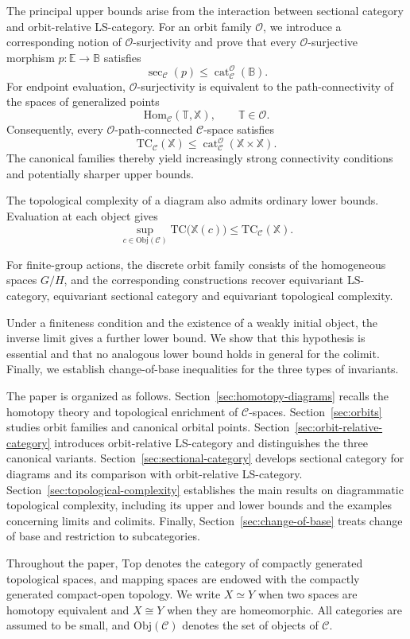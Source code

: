 \documentclass[12pt]{amsart}
\theoremstyle{definition}
\theoremstyle{remark}
\numberwithin{figure}{section}%
\newcommand{\CC}{\mathcal{C}}
\newcommand{\cat}{\mathop{\mathrm{cat}}}
\newcommand{\TC}{\mathrm{TC}}
\newcommand{\Top}{\mathrm{Top}}
\newcommand{\X}{\mathbb{X}}
\newcommand{\T}{\mathbb{T}}
\newcommand{\Hom}{\mathrm{Hom}}
\newcommand{\Obj}{\mathrm{Obj}}
\newcommand{\Ee}{\mathbb{E}}
\newcommand{\Bb}{\mathbb{B}}
\begin{document}
The principal upper bounds arise from the interaction between
sectional category and orbit-relative LS-category. For an orbit family
$\mathcal O$, we introduce a corresponding notion of
$\mathcal O$-surjectivity and prove that every
$\mathcal O$-surjective morphism
$p\colon\Ee\to\Bb$ satisfies
\[
\sec_{\CC}(p)
\leq
\cat_{\CC}^{\mathcal O}(\Bb).
\]
For endpoint evaluation, $\mathcal O$-surjectivity is equivalent to the
path-connectivity of the spaces of generalized points
\[
\Hom_{\CC}(\T,\X),
\qquad
\T\in\mathcal O.
\]
Consequently, every $\mathcal O$-path-connected $\CC$-space satisfies
\[
\TC_{\CC}(\X)
\leq
\cat_{\CC}^{\mathcal O}(\X\times\X).
\]
The canonical families thereby yield increasingly strong connectivity
conditions and potentially sharper upper bounds.

The topological complexity of a diagram also admits ordinary lower
bounds. Evaluation at each object gives
\[
\sup_{c\in\Obj(\CC)}
\TC\bigl(\X(c)\bigr)
\leq
\TC_{\CC}(\X).
\]

For finite-group actions, the discrete orbit family consists of the
homogeneous spaces $G/H$, and the corresponding constructions recover
equivariant LS-category, equivariant sectional category and equivariant
topological complexity. 

Under a finiteness condition and the existence of a weakly initial
object, the inverse limit gives a further lower bound. We show that this
hypothesis is essential and that no analogous lower bound holds in
general for the colimit. Finally, we establish change-of-base inequalities for the three types
of invariants.

The paper is organized as follows.
Section~\ref{sec:homotopy-diagrams} recalls the homotopy theory and
topological enrichment of $\CC$-spaces.
Section~\ref{sec:orbits} studies orbit families and canonical orbital
points.
Section~\ref{sec:orbit-relative-category} introduces orbit-relative
LS-category and distinguishes the three canonical variants.
Section~\ref{sec:sectional-category} develops sectional category for
diagrams and its comparison with orbit-relative LS-category.
Section~\ref{sec:topological-complexity} establishes the main results
on diagrammatic topological complexity, including its upper and lower
bounds and the examples concerning limits and colimits.
Finally, Section~\ref{sec:change-of-base} treats change of base and
restriction to subcategories.


Throughout the paper, $\Top$ denotes the category of compactly generated
topological spaces, and mapping spaces are endowed with the compactly
generated compact-open topology. We write $X\simeq Y$ when two spaces
are homotopy equivalent and $X\cong Y$ when they are homeomorphic. All
categories are assumed to be small, and $\Obj(\CC)$ denotes the set of
objects of $\CC$.
\end{document}
